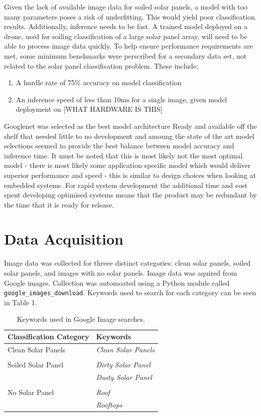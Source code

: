 \documentclass[10pt,journal,compsoc]{IEEEtran}
\begin{document}
		Given the lack of available image data for soiled solar panels, a model with too many parameters poses a risk of underfitting. This would yield poor classification results. Additionally, inference needs to be fast. A trained model deployed on a drone, used for soiling classification of a large solar panel array, will need to be able to process image data quickly. To help ensure performance requirements are met, some minimum benchmarks were perscribed for a secondary data set, not related to the solar panel classification problem. These include:
		\begin{enumerate}
			\item A hurdle rate of 75\% accuracy on model classification
			\item An inference speed of less than 10$\si{\milli\second}$ for a single image, given model deployment on [WHAT HARDWARE IS THIS]
		\end{enumerate}
		
		Googlenet was selected as the best model architecture Ready and available off the shelf that needed little to no development and amoung the state of the art model selections seemed to provide the best balance between model accuracy and inference time. It must be noted that this is most likely not the most optimal model - there is most likely some application specific model which would deliver superior performance and speed - this is similar to design choices when looking at embedded systems. For rapid system development the additional time and cost spent developing optimised systems means that the product may be redundant by the time that it is ready for release.
			
		\section{Data Acquisition}
		Image data was collected for threee distinct categories: clean solar panels, soiled solar panels, and images with no solar panels. Image data was aquired from Google images. Collection was automoated using a Python module called \verb|google_images_download|. Keywords used to search for each category can be seen in Table 1.
		\begin{table}[h]
			\centering
			\caption{Keywords used in Google Image searches.}
			\begin{tabular}{ll}
				\toprule
				\textbf{Classification Category} & \textbf{Keywords} \\
				\midrule
				Clean Solar Panels & \textit{Clean Solar Panels}\\
				 & \\
				Soiled Solar Panel & \textit{Dirty Solar Panel} \\
				 & \textit{Dusty Solar Panel} \\
				  & \\
				No Solar Panel & \textit{Roof} \\
				 & \textit{Rooftops} \\
				\bottomrule
			\end{tabular}
		\end{table}
		
\end{document}
